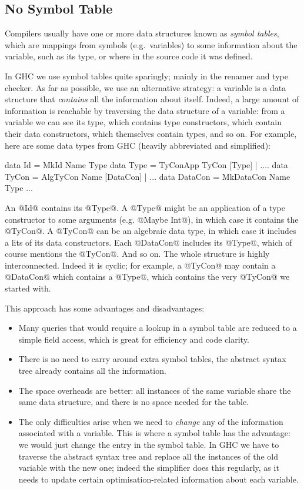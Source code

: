 \documentclass{article}
\begin{document}
\subsection{No Symbol Table}

Compilers usually have one or more data structures known as
\emph{symbol tables}, which are mappings from symbols (e.g.\ variables)
to some information about the variable, such as its type, or where in
the source code it was defined.

In GHC we use symbol tables quite sparingly; mainly in the renamer and
type checker.  As far as possible, we use an alternative strategy: a
variable is a data structure that \emph{contains} all the information
about itself.  Indeed, a large amount of information is reachable by
traversing the data structure of a variable: from a variable we can
see its type, which contains type constructors, which contain their
data constructors, which themselves contain types, and so on.  
For example, here are some 
data types from GHC (heavily abbreviated and simplified):
\begin{code}
  data Id      = MkId Name Type
  data Type    = TyConApp TyCon [Type]
               | ....
  data TyCon   = AlgTyCon Name [DataCon]
               | ...
  data DataCon = MkDataCon Name Type ...
\end{code}
An @Id@ contains its @Type@.  A @Type@ might be an application of a type 
constructor to some arguments (e.g. @Maybe Int@), in which case it contains
the @TyCon@.  A @TyCon@ can be an algebraic data type, in which case it includes
a lits of its data constructors.  Each @DataCon@ includes its @Type@, which of course
mentions the @TyCon@.   And so on.
The whole structure is highly interconnected.  Indeed it is cyclic; for example,
a @TyCon@ may contain a @DataCon@ which contains a @Type@, which contains the
very @TyCon@ we started with.

This approach has some advantages and disadvantages:

\begin{itemize}
\item Many queries that would require a lookup in a symbol table are
  reduced to a simple field access, which is great for efficiency and
  code clarity.
\item There is no need to carry around extra symbol tables, the
  abstract syntax tree already contains all the information.
\item The space overheads are better: all instances of the same
  variable share the same data structure, and there is no space needed
  for the table.
\item The only difficulties arise when we need to \emph{change} any of
  the information associated with a variable.  This is where a symbol
  table has the advantage: we would just change the entry in the
  symbol table.  In GHC we have to traverse the abstract syntax tree
  and replace all the instances of the old variable with the new one;
  indeed the simplifier does this regularly, as it needs to update
  certain optimisation-related information about each variable.
\end{itemize}
\end{document}
